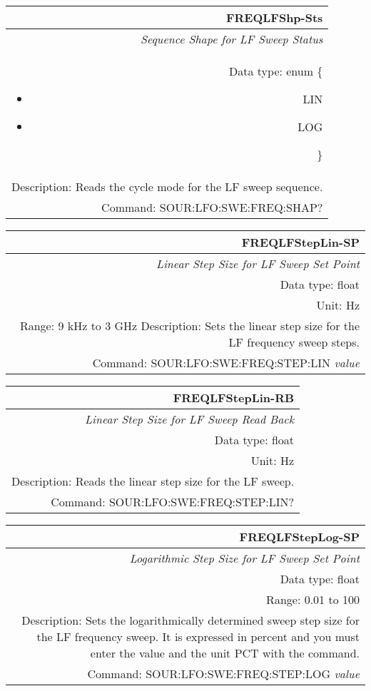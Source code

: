 \documentclass[openany]{article}
\begin{document}
		\begin{tabular}{N}
			\hline
			\bfseries FREQLFShp-Sts \\ \hline
			\emph{Sequence Shape for LF Sweep Status} \\
			Data type: enum \{\begin{itemize}[noitemsep]
				\small
				\item[] LIN
				\item[] LOG
			\end{itemize}\} \\ 
			Description: Reads the cycle mode for the LF sweep sequence. \\
			Command: SOUR:LFO:SWE:FREQ:SHAP? \\

		\end{tabular}
%
		\begin{tabular}{N}
			\hline
			\bfseries FREQLFStepLin-SP \\ \hline
			\emph{Linear Step Size for LF Sweep Set Point} \\
			Data type: float \\
			Unit: Hz \\ 
			Range: 9 kHz to 3 GHz
			Description: Sets the linear step size for the LF frequency sweep steps.\\
			Command: SOUR:LFO:SWE:FREQ:STEP:LIN \emph{value} \\
			
		\end{tabular}


		\begin{tabular}{N}
			\hline
			\bfseries FREQLFStepLin-RB \\ \hline
			\emph{Linear Step Size for LF Sweep Read Back} \\
			Data type: float \\
			Unit: Hz \\
			Description: Reads the linear step size for the LF sweep. \\
			Command: SOUR:LFO:SWE:FREQ:STEP:LIN? \\

		\end{tabular}
%
		\begin{tabular}{N}
			\hline
			\bfseries FREQLFStepLog-SP \\ \hline
			\emph{Logarithmic Step Size for LF Sweep Set Point} \\
			Data type: float \\
			Range: 0.01 to 100 \\
			Description: Sets the logarithmically determined sweep step size for the LF frequency sweep. It is expressed in percent and you must enter the value and the unit PCT with the command.\\
			Command: SOUR:LFO:SWE:FREQ:STEP:LOG \emph{value} \\
			
		\end{tabular}
\end{document}
